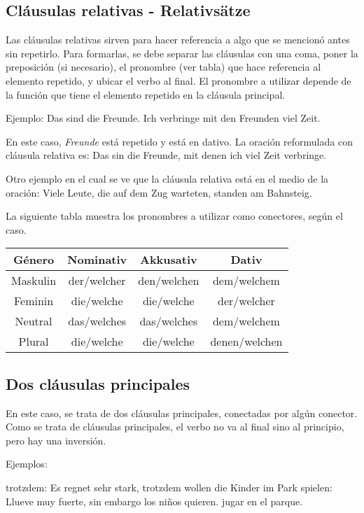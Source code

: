 \subsection{Cláusulas relativas - Relativsätze}
Las cláusulas relativas sirven para hacer referencia a algo que se mencionó antes sin repetirlo. Para formarlas, se debe separar las cláusulas con una coma, poner la preposición (si necesario), el pronombre (ver tabla) que hace referencia al elemento repetido, y ubicar el verbo al final. El pronombre a utilizar depende de la función que tiene el elemento repetido en la cláusula principal.

Ejemplo: Das sind die Freunde. Ich verbringe mit den Freunden viel Zeit. 

En este caso, \textit{Freunde} está repetido y está en dativo. La oración reformulada con cláusula relativa es: Das sin die Freunde, mit denen ich viel Zeit verbringe.

Otro ejemplo en el cual se ve que la cláusula relativa está en el medio de la oración: Viele Leute, die auf dem Zug warteten, standen am Bahnsteig.


La siguiente tabla muestra los pronombres a utilizar como conectores, según el caso.

\begin{tabular}{|c | c | c | c |}
\hline
\textbf{Género} & \textbf{Nominativ} & \textbf{Akkusativ} & \textbf{Dativ}\\
\hline
Maskulin & der/welcher & den/welchen & dem/welchem  \\
Feminin  & die/welche  & die/welche  & der/welcher \\
Neutral  & das/welches & das/welches & dem/welchem \\
Plural   & die/welche  & die/welche  & denen/welchen \\
\hline
\end{tabular}

\subsection{Dos cláusulas principales}
En este caso, se trata de dos cláusulas principales, conectadas por algún conector. Como se trata de cláusulas principales, el verbo no va al final sino al principio, pero hay una inversión.

Ejemplos:
\begin{myitemize}
\item trotzdem: Es regnet sehr stark, trotzdem wollen die Kinder im Park spielen: Llueve muy fuerte, sin embargo los niños quieren. jugar en el parque.
\end{myitemize}

